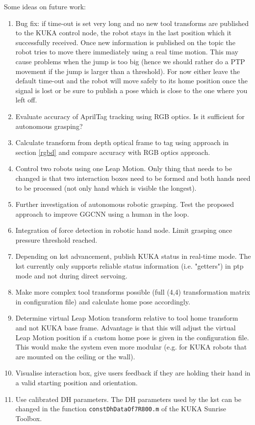 \documentclass[headsepline,footinclude=false,fontsize=11pt,paper=a4,listof=totoc,bibliography=totoc,BCOR=12mm,DIV=14]{scrbook}
\begin{document}
Some ideas on future work: 
\begin{enumerate}
	\item Bug fix: if time-out is set very long and no new tool transforms are published to the KUKA control node, the robot stays in the last position which it successfully received. Once new information is published on the topic the robot tries to move there immediately using a real time motion. This may cause problems when the jump is too big (hence we should rather do a PTP movement if the jump is larger than a threshold). For now either leave the default time-out and the robot will move safely to its home position once the signal is lost or be sure to publish a pose which is close to the one where you left off.
	\item Evaluate accuracy of AprilTag tracking using RGB optics. Is it sufficient for autonomous grasping? 
	\item Calculate transform from depth optical frame to tag using approach in section \ref{rgbd} and compare accuracy with RGB optics approach. 
	\item Control two robots using one Leap Motion. Only thing that needs to be changed is that two interaction boxes need to be formed and both hands need to be processed (not only hand which is visible the longest).
	\item Further investigation of autonomous robotic grasping. Test the proposed approach to improve GGCNN using a human in the loop. 
	\item Integration of force detection in robotic hand node. Limit grasping once pressure threshold reached.
	\item Depending on \gls{kst} advancement, publish KUKA status in real-time mode. The \gls{kst} currently only supports reliable status information (i.e. "getters") in \gls{ptp} mode and not during direct servoing.
	\item Make more complex tool transforms possible (full (4,4) transformation matrix in configuration file) and calculate home pose accordingly.
	\item Determine virtual Leap Motion transform relative to tool home transform and not KUKA base frame. Advantage is that this will adjust the virtual Leap Motion position if a custom home pose is given in the configuration file. This would make the system even more modular (e.g. for KUKA robots that are mounted on the ceiling or the wall).
	\item Visualise interaction box, give users feedback if they are holding their hand in a valid starting position and orientation.
	\item Use calibrated DH parameters. The DH parameters used by the \gls{kst} can be changed in the function \texttt{constDhDataOf7R800.m} of the KUKA Sunrise Toolbox.
\end{enumerate}

\printbibliography
\end{document}

